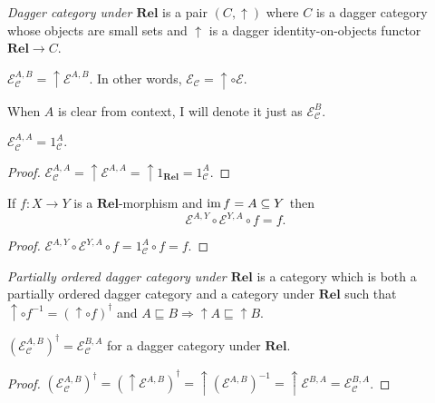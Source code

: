 \begin{defn}
  \emph{Dagger category under $\mathbf{Rel}$} is a pair $(C ,
  \uparrow)$ where $C$ is a dagger category whose objects are small sets and
  $\uparrow$ is a dagger identity-on-objects functor $\mathbf{Rel}
  \rightarrow C$.
\end{defn}

\begin{defn}
  $\mathcal{E}_{\mathcal{C}}^{A,B} = \uparrow \mathcal{E}^{A,B}$. In
  other words, $\mathcal{E}_{\mathcal{C}} = \uparrow \circ \mathcal{E}$.
  
  When $A$ is clear from context, I will denote it just as $\mathcal{E}_{\mathcal{C}}^B$.
\end{defn}

\begin{prop}
  $\mathcal{E}_{\mathcal{C}}^{A,A} = 1_{\mathcal{C}}^A$.
\end{prop}

\begin{proof}
  $\mathcal{E}_{\mathcal{C}}^{A,A} = \uparrow \mathcal{E}^{A,A} =
  \uparrow 1_{\mathbf{Rel}} = 1_{\mathcal{C}}^A$.
\end{proof}

\begin{prop}
  If $f : X \rightarrow Y$ is a $\mathbf{Rel}$-morphism and
  $\operatorname{im} f = A \subseteq Y$ then
  \[ \mathcal{E}^{A,Y} \circ \mathcal{E}^{Y,A} \circ f = f. \]
\end{prop}

\begin{proof}
  $\mathcal{E}^{A,Y} \circ \mathcal{E}^{Y,A} \circ f = 1_{\mathcal{C}}^A
  \circ f = f$.
\end{proof}

\begin{defn}
  \emph{Partially ordered dagger category under $\mathbf{Rel}$} is
  a category which is both a partially ordered dagger category and a category
  under $\mathbf{Rel}$ such that $\uparrow \circ f^{- 1} = (\uparrow
  \circ f)^{\dagger}$ and $A \sqsubseteq B \Rightarrow \uparrow A \sqsubseteq
  \uparrow B$.
\end{defn}

\begin{prop}
  $(\mathcal{E}_{\mathcal{C}}^{A,B})^{\dagger} = \mathcal{E}_{\mathcal{C}}^{B,A}$ for a dagger category under
  $\mathbf{Rel}$.
\end{prop}

\begin{proof}
  $(\mathcal{E}_{\mathcal{C}}^{A,B})^{\dagger} = (\uparrow \mathcal{E}^{A,B})^{\dagger} = \uparrow (\mathcal{E}^{A,B})^{- 1} =
  \uparrow \mathcal{E}^{B,A} = \mathcal{E}_{\mathcal{C}}^{B,A}$.
\end{proof}

